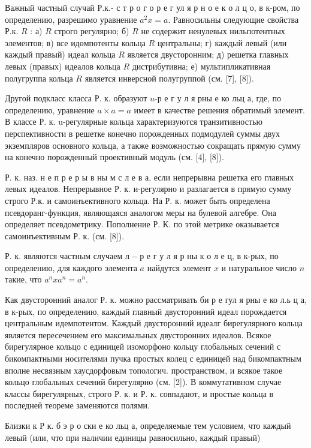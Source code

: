 \documentclass[10pt]{article}
\begin{document}
Важный частный случай Р.к.- с т р о г о р е г ул я р н о е к о л ц о, в к-ром, по определению, разрешимо уравнение $a^{2} x=a$. Равносильны следующие свойства Р.к. $R$ : а) $R$ строго регулярно; б) $R$ не содержит ненулевых нильпотентных элементов; в) все идөмпотенты кольца $R$ центральны; г) каждый левый (или каждый правый) идеал кольца $R$ является двусторонним; д) решетка главных левых (правых) идеалов кольца $R$ дистрибутивна; е) мультипликативная полугруппа кольца $R$ является инверсной полугруппой (см. [7], [8]).



Другой подкласс класса Р. к. образуют $u$-р е г у л я рны е ко льц а, где, по определению, уравнение $a \times a=a$ имеет в качестве решения обратимый элемент. В классе Р. к. u-регулярные кольца характеризуются транзитивностью перспективности в решетке конечно порожденных подмодулей суммы двух экземпляров основного кольца, а также возможностью сокращать прямую сумму на конечно порожденный проективный модуль (см. [4], [8]).



Р. к. наз. н е п р е р ы в ны м с л е в а, если непрерывна решетка его главных левых идеалов. Непрерывное Р. к. и-регулярно и разлагается в прямую сумму строго Р.к. и самоинъективного кольца. На Р. к. может быть определена псевдоранг-функция, являющаяся аналогом меры на булевой алгебре. Она определяет псевдометрику. Пополнение Р. К. по этой метрике оказывается самоинъективным Р. к. (см. [8]).



Р. к. являются частным случаем $л-р$ е г у л я р ны к о л е ц, в к-рых, по определению, для каждого элемента $a$ найдутся элемент $x$ и натуральное число $n$ такие, что $a^{n} x a^{n}=a^{n}$.



Как двусторонний аналог Р. к. можно рассматривать би р е гул я рны е ко л.ь ц а, в к-рых, по определению, каждый главный двусторонний идеал порождается центральным идемпотентом. Каждый двусторонний идеалг бирегулярного кольца является пересечением его максимальных двусторонних идеалов. Всякое бирегулярное кольцо с единицей изоморфоно кольцу глобальных сечений с бикомпактными носителями пучка простых колец с единицей над бикомпактным вполне несвязным хаусдорфовым топологич. пространством, и всякое такое кольцо глобальных сечений бирегулярно (см. [2]). В коммутативном случае классы бирегулярных, строго Р. к. и Р. к. совпадают, и простые кольца в последнеӥ теореме заменяются полями.



Близки к Р к. б э р о ски е ко льц а, определяемые тем условием, что каждый левый (или, что при наличии единицы равносильно, каждый правый)
\end{document}
